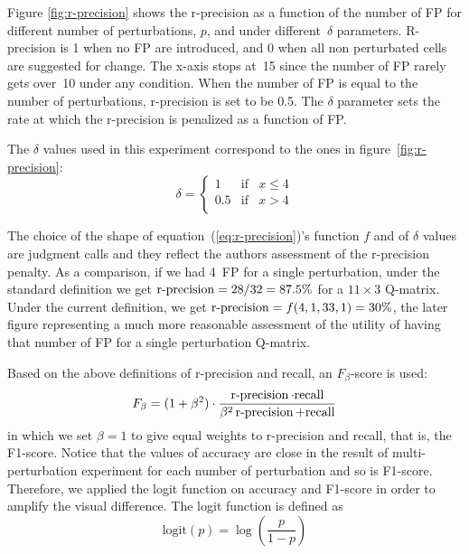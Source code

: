 \documentclass{edm_template}
\begin{document}
Figure \ref{fig:r-precision} shows the r-precision as a function of the number of FP for different number of perturbations, $p$, and under different~$\delta$ parameters.  R-precision is 1 when no FP are introduced, and 0 when all non perturbated cells are suggested for change.  The x-axis stops at~15 since the number of FP rarely gets over~10 under any condition.  When the number of FP is equal to the number of perturbations, r-precision is set to be 0.5. The $\delta$ parameter sets the rate at which the r-precision is penalized as a function of FP.

The $\delta$ values used in this experiment correspond to the ones in figure~\ref{fig:r-precision}:
\begin{equation*}
\delta = \left\lbrace 
\begin{array}{lll}
  1 & \mathrm{if} & x \leq 4\\
  0.5 & \mathrm{if} & x > 4\\
\end{array}
\right.
\end{equation*}

The choice of the shape of equation~(\ref{eq:r-precision})'s function $f$ and of $\delta$ values are judgment calls and they reflect the authors assessment of the r-precision penalty.  As a comparison, if we had 4~FP for a single perturbation, under the standard definition we get $\mathrm{\operatorname{r-precision}}=28/32=87.5\%$ for a $11 \times 3$ Q-matrix. Under the current definition, we get $\mathrm{\operatorname{r-precision}}=f(4,1,33,1)=30\%$, the later figure representing a much more reasonable assessment of the utility of having that number of FP for a single perturbation Q-matrix.

Based on the above definitions of r-precision and recall, an $F_\beta$-score is used:
$$ F_\beta=(1+\beta^2)\cdot \frac{\operatorname{r-precision} \cdot \mathrm{recall}}{\beta^2\operatorname{r-precision} + \mathrm{recall}}$$
in which we set $\beta=1$ to give equal weights to r-precision and recall, that is, the F1-score. Notice that the values of accuracy are close in the result of multi-perturbation experiment for each number of perturbation and so is F1-score. Therefore, we applied the logit function on accuracy and F1-score in order to amplify the visual difference. The logit function is defined as
$$ \mathrm{logit}(p)=\log\left(\frac{p}{1-p}\right) $$


\end{document}
